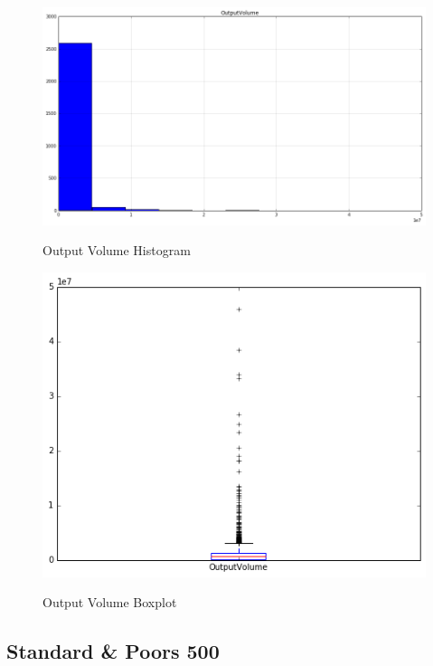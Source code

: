 \begin{figure}[bth]
  \myfloatalign
  {\includegraphics[width=1\linewidth]
    {gfx/output-volume-histogram}}
  \caption{Output Volume
    Histogram}
  \label{fig:output-volume-histogram}
\end{figure}

\begin{figure}[bth]
  \myfloatalign
  {\includegraphics[width=1\linewidth]
    {gfx/output-volume-boxplot}}
  \caption{Output Volume
    Boxplot}
  \label{fig:output-volume-boxplot}
\end{figure}

\clearpage

\subsection{Standard \& Poors 500}
\label{sec:standard-and-poors-500}

